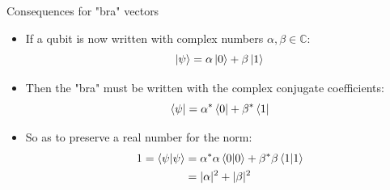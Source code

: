 \documentclass[aspectratio=169,12pt]{beamer}
\begin{document}
\begin{frame}{Consequences for "bra" vectors}
    \begin{itemize}
        \item If a qubit is now written with complex numbers $\alpha,\beta\in\mathbb{C}$:
        \begin{equation*}
            \ket{\psi} = \alpha \ket{0} + \beta \ket{1}
        \end{equation*}

        \item Then the "bra" must be written with the complex conjugate coefficients:
        \begin{equation*}
            \bra{\psi} = \alpha^* \bra{0} + \beta^* \bra{1}
        \end{equation*}

        \item So as to preserve a real number for the norm: 
        \begin{align*}
            1 = \braket{\psi}{\psi} 
            &= \alpha^*\alpha \braket{0}{0} + \beta^*\beta \braket{1}{1} \\ 
            &= |\alpha|^2 + |\beta|^2
        \end{align*}
    \end{itemize}
\end{frame}
\end{document}
